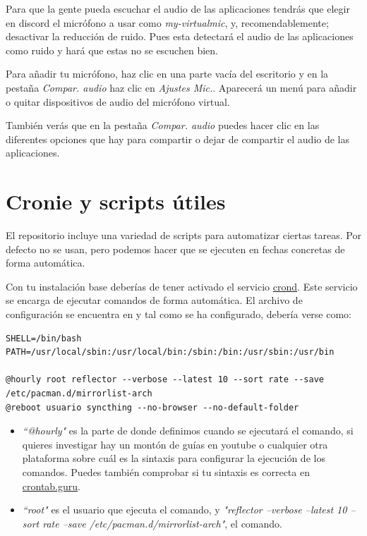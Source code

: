 \documentclass[11pt]{article}
\begin{document}
\vspace{5pt}

\noindent Para que la gente pueda escuchar el audio de las aplicaciones tendrás que elegir en discord el micrófono a usar como \textit{my-virtualmic}, y, recomendablemente; desactivar la reducción de ruido. Pues esta detectará el audio de las aplicaciones como ruido y hará que estas no se escuchen bien.

\vspace{5pt}

Para añadir tu micrófono, haz clic en una parte vacía del escritorio y en la pestaña \textit{Compar. audio} haz clic en \textit{Ajustes Mic.}. Aparecerá un menú para añadir o quitar dispositivos de audio del micrófono virtual.

\vspace{5pt}

\noindent También verás que en la pestaña \textit{Compar. audio} puedes hacer clic en las diferentes opciones que hay para compartir o dejar de compartir el audio de las aplicaciones.

\section{Cronie y scripts útiles}

El repositorio incluye una variedad de scripts para automatizar ciertas tareas. Por defecto no se usan, pero podemos hacer que se ejecuten en fechas concretas de forma automática.

\vspace{5pt}

\noindent Con tu instalación base deberías de tener activado el servicio \href{https://wiki.archlinux.org/title/cron}{crond}. Este servicio se encarga de ejecutar comandos de forma automática. El archivo de configuración se encuentra en  y tal como se ha configurado, debería verse como:

\vspace{10pt}

\begin{lstlisting}[basicstyle=\scriptsize\ttfamily]
SHELL=/bin/bash
PATH=/usr/local/sbin:/usr/local/bin:/sbin:/bin:/usr/sbin:/usr/bin

@hourly root reflector --verbose --latest 10 --sort rate --save /etc/pacman.d/mirrorlist-arch
@reboot usuario syncthing --no-browser --no-default-folder
\end{lstlisting}

\begin{itemize}
	\item \textit{``@hourly"} es la parte de donde definimos cuando se ejecutará el comando, si quieres investigar hay un montón de guías en youtube o cualquier otra plataforma sobre cuál es la sintaxis para configurar la ejecución de los comandos. Puedes también comprobar si tu sintaxis es correcta en \href{https://crontab.guru/}{crontab.guru}.
	\item \textit{``root"} es el usuario que ejecuta el comando, y \textit{"reflector --verbose --latest 10 --sort rate --save /etc/pacman.d/mirrorlist-arch"}, el comando.
\end{itemize}
\end{document}
